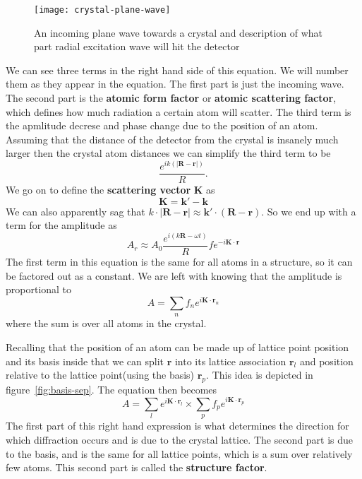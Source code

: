 \documentclass[11pt]{article}
\begin{document}
\begin{figure}[!h]
	\centering
	\texttt{[image: crystal-plane-wave]}
	\caption{An incoming plane wave towards a crystal and description of what part radial excitation wave will hit the detector}
	\label{fig:crystal-plane-wave}
\end{figure}

We can see three terms in the right hand side of this equation. We will number them as they appear in the equation. The first part is just the incoming wave. The second part is the \textbf{atomic form factor} or \textbf{atomic scattering factor}, which defines how much radiation a certain atom will scatter. The third term is the apmlitude decrese and phase change due to the position of an atom. Assuming that the distance of the detector from the crystal is insanely much larger then the crystal atom distances we can simplify the third term to be
\begin{equation}
	\frac{e^{ik(|\mathbf{R} - \mathbf{r}|)}}{R}.
\end{equation}
We go on to define the \textbf{scattering vector} $\mathbf{K}$ as 
\begin{equation}
	\mathbf{K} = \mathbf{k}'-\mathbf{k}
\end{equation}
We can also apparently sag that $k \cdot |\mathbf{R}-\mathbf{r}| \approx \mathbf{k}'\cdot (\mathbf{R}-\mathbf{r})$. So we end up with a term for the amplitude as 
\begin{equation}
	A_r \approx A_0 \frac{e^{i(k\mathbf{R}-\omega t)}}{R} f e^{-i\mathbf{K} \cdot \mathbf{r}}
\end{equation}
The first term in this equation is the same for all atoms in a structure, so it can be factored out as a constant. We are left with knowing that the amplitude is proportional to
\begin{equation}
	A = \sum_n f_n e^{i\mathbf{K} \cdot \mathbf{r}_n}
\end{equation}
where the sum is over all atoms in the crystal.

Recalling that the position of an atom can be made up of lattice point position and its basis inside that we can split $\mathbf{r}$ into its lattice association $\mathbf{r}_l$ and position relative to the lattice point(using the basis) $\mathbf{r}_p$. This idea is depicted in figure~\ref{fig:basis-sep}. The equation then becomes
\begin{equation}
	A = \sum_l  e^{i\mathbf{K} \cdot \mathbf{r}_l} \times \sum_p f_p e^{i\mathbf{K} \cdot \mathbf{r}_p}
	\label{eq:ampl}
\end{equation}
The first part of this right hand expression is what determines the direction for which diffraction occurs and is due to the crystal lattice. The second part is due to the basis, and is the same for all lattice points, which is a sum over relatively few atoms. This second part is called the \textbf{structure factor}.
\end{document}
